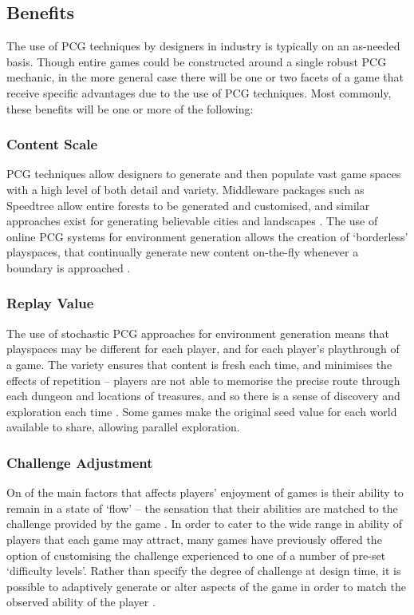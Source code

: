 \documentclass{acm_proc_article-sp}
\begin{document}
\subsection{Benefits}
The use of PCG techniques by designers in industry is typically on an as-needed basis. Though entire games could be constructed around a single robust PCG mechanic, in the more general case there will be one or two facets of a game that receive specific advantages due to the use of PCG techniques. Most commonly, these benefits will be one or more of the following:


\subsubsection{Content Scale}
PCG techniques allow designers to generate and then populate vast game spaces with a high level of both detail and variety. Middleware packages such as Speedtree\cite{speedtree} allow entire forests to be generated and customised, and similar approaches exist for generating believable cities and landscapes \cite{carli2011survey}. The use of online PCG systems for environment generation allows the creation of `borderless' playspaces, that continually generate new content on-the-fly whenever a boundary is approached \cite{mario}.

\subsubsection{Replay Value}
The use of stochastic PCG approaches for environment generation means that playspaces may be different for each player, and for each player's playthrough of a game. The variety ensures that content is fresh each time, and minimises the effects of repetition -- players are not able to memorise the precise route through each dungeon and locations of treasures, and so there is a sense of discovery and exploration each time \cite{hendrikx2012procedural}. Some games make the original seed value for each world available to share, allowing parallel exploration.

\subsubsection{Challenge Adjustment}
\label{sec:DDA}
On of the main factors that affects players' enjoyment of games is their ability to remain in a state of `flow' -- the sensation that their abilities are matched to the challenge provided by the game \cite{flow}.
In order to cater to the wide range in ability of players that each game may attract, many games have previously offered the option of customising the challenge experienced to one of a number of pre-set `difficulty levels'. 
Rather than specify the degree of challenge at design time, it is possible to adaptively generate or alter aspects of the game \cite{lopes2011adaptivity} in order to match the observed ability of the player \cite{ResE5}.
\end{document}
